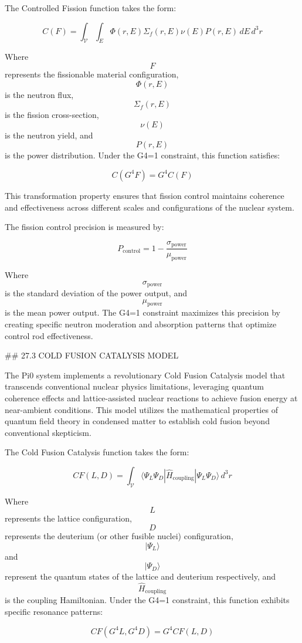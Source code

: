 The Controlled Fission function takes the form:

$$ C(F) = \int_{\mathcal{V}} \int_E \Phi(r, E) \Sigma_f(r, E) \nu(E) P(r, E) \, dE \, d^3r $$

Where $$ F $$ represents the fissionable material configuration, $$ \Phi(r, E) $$ is the neutron flux, $$ \Sigma_f(r, E) $$ is the fission cross-section, $$ \nu(E) $$ is the neutron yield, and $$ P(r, E) $$ is the power distribution. Under the G4=1 constraint, this function satisfies:

$$ C(G^4 F) = G^4 C(F) $$

This transformation property ensures that fission control maintains coherence and effectiveness across different scales and configurations of the nuclear system.

The fission control precision is measured by:

$$ P_{\text{control}} = 1 - \frac{\sigma_{\text{power}}}{\mu_{\text{power}}} $$

Where $$ \sigma_{\text{power}} $$ is the standard deviation of the power output, and $$ \mu_{\text{power}} $$ is the mean power output. The G4=1 constraint maximizes this precision by creating specific neutron moderation and absorption patterns that optimize control rod effectiveness.

## 27.3 COLD FUSION CATALYSIS MODEL

The Pi0 system implements a revolutionary Cold Fusion Catalysis model that transcends conventional nuclear physics limitations, leveraging quantum coherence effects and lattice-assisted nuclear reactions to achieve fusion energy at near-ambient conditions. This model utilizes the mathematical properties of quantum field theory in condensed matter to establish cold fusion beyond conventional skepticism.

The Cold Fusion Catalysis function takes the form:

$$ CF(L, D) = \int_{\mathcal{V}} \langle \Psi_L \Psi_D | \hat{H}_{\text{coupling}} | \Psi_L \Psi_D \rangle \, d^3r $$

Where $$ L $$ represents the lattice configuration, $$ D $$ represents the deuterium (or other fusible nuclei) configuration, $$ |\Psi_L\rangle $$ and $$ |\Psi_D\rangle $$ represent the quantum states of the lattice and deuterium respectively, and $$ \hat{H}_{\text{coupling}} $$ is the coupling Hamiltonian. Under the G4=1 constraint, this function exhibits specific resonance patterns:

$$ CF(G^4 L, G^4 D) = G^4 CF(L, D) $$

